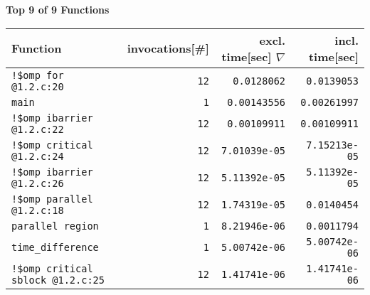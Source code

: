 \documentclass[a4paper,10pt]{article}
\begin{document}
\newpage

\begin{center}\small
{\Large \bf Top 9 of 9 Functions}
\bigskip
\begin{longtable}{|l||r|r|r|}

   \hline
   \bf Function & \bf invocations[\#] & \bf excl. time[sec] $\nabla$ & \bf incl. time[sec] \\
   \hline\hline
  \verb|!$omp for @1.2.c:20| &   \verb|12| &   \verb|0.0128062| &   \verb|0.0139053| \\
  \verb|main| &   \verb|1| &   \verb|0.00143556| &   \verb|0.00261997| \\
  \verb|!$omp ibarrier @1.2.c:22| &   \verb|12| &   \verb|0.00109911| &   \verb|0.00109911| \\
      \hline
  \verb|!$omp critical @1.2.c:24| &   \verb|12| &   \verb|7.01039e-05| &   \verb|7.15213e-05| \\
  \verb|!$omp ibarrier @1.2.c:26| &   \verb|12| &   \verb|5.11392e-05| &   \verb|5.11392e-05| \\
  \verb|!$omp parallel @1.2.c:18| &   \verb|12| &   \verb|1.74319e-05| &   \verb|0.0140454| \\
      \hline
  \verb|parallel region| &   \verb|1| &   \verb|8.21946e-06| &   \verb|0.0011794| \\
  \verb|time_difference| &   \verb|1| &   \verb|5.00742e-06| &   \verb|5.00742e-06| \\
  \verb|!$omp critical sblock @1.2.c:25| &   \verb|12| &   \verb|1.41741e-06| &   \verb|1.41741e-06| \\
   \hline
\end{longtable}

\end{center}
\newpage
\end{document}
